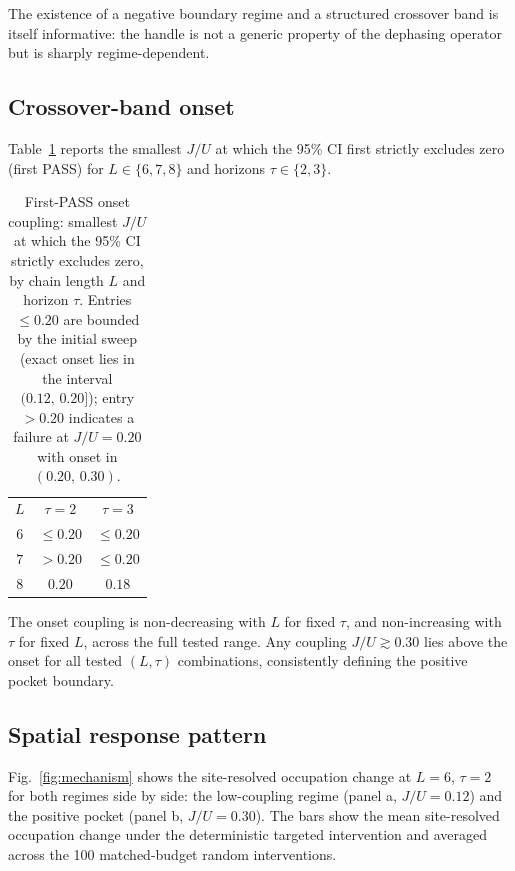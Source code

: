 \documentclass[aps,pra,reprint,amsmath,amssymb,longbibliography,floatfix]{revtex4-2}
\begin{document}
The existence of a negative boundary regime and a structured crossover band
is itself informative: the handle is not a generic property of the dephasing
operator but is sharply regime-dependent.

\subsection{Crossover-band onset}
\label{sec:onset}

Table~\ref{tab:onset} reports the smallest $J/U$ at which the 95\% CI first
strictly excludes zero (first PASS) for $L\in\{6,7,8\}$ and horizons
$\tau\in\{2,3\}$.

\begin{table}[tbp]
\centering
\caption{First-PASS onset coupling: smallest $J/U$ at which the 95\% CI
strictly excludes zero, by chain length $L$ and horizon $\tau$.
Entries $\leq\!0.20$ are bounded by the initial sweep (exact onset lies
in the interval $(0.12,\,0.20]$); entry $>\!0.20$ indicates a failure at
$J/U=0.20$ with onset in $(0.20,\,0.30)$.}
\label{tab:onset}
\begin{ruledtabular}
\begin{tabular}{ccc}
$L$ & $\tau=2$ & $\tau=3$ \\
\colrule
$6$ & $\leq0.20$ & $\leq0.20$ \\
$7$ & $>0.20$    & $\leq0.20$ \\
$8$ & $0.20$     & $0.18$     \\
\end{tabular}
\end{ruledtabular}
\end{table}

The onset coupling is non-decreasing with $L$ for fixed $\tau$,
and non-increasing with $\tau$ for fixed $L$, across the full tested range.
Any coupling $J/U\gtrsim0.30$ lies above the onset for all tested
$(L,\tau)$ combinations, consistently defining the positive pocket boundary.

\subsection{Spatial response pattern}

Fig.~\ref{fig:mechanism} shows the site-resolved occupation change at
$L=6$, $\tau=2$ for both regimes side by side: the low-coupling regime
(panel a, $J/U=0.12$) and the positive pocket (panel b, $J/U=0.30$).
The bars show the mean site-resolved occupation change under the
deterministic targeted intervention and averaged across the 100
matched-budget random interventions.
\end{document}

